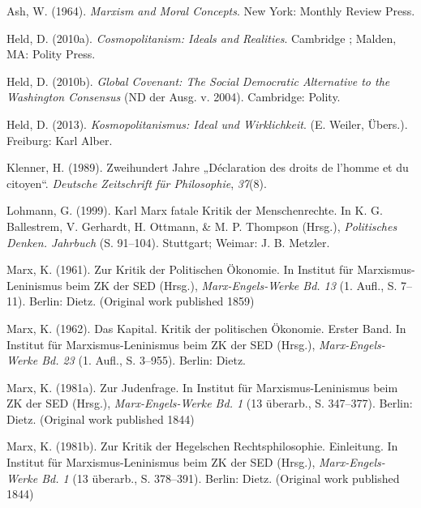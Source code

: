 \documentclass[ngerman,12pt, titlepage, smallheadings, nomath]{scrartcl}
\begin{document}
\vspace{-1em}

\indent
\vspace{-2em} \begingroup
\setlength{\parindent}{-0.2in} \setlength{\leftskip}{0.2in}
\setlength{\parskip}{8pt} \singlespacing

\hypertarget{refs}{}
\hypertarget{ref-ash1964}{}
Ash, W. (1964). \emph{Marxism and Moral Concepts}. New York: Monthly
Review Press.

\hypertarget{ref-held2010a}{}
Held, D. (2010a). \emph{Cosmopolitanism: Ideals and Realities}.
Cambridge ; Malden, MA: Polity Press.

\hypertarget{ref-held2010b}{}
Held, D. (2010b). \emph{Global Covenant: The Social Democratic
Alternative to the Washington Consensus} (ND der Ausg. v. 2004).
Cambridge: Polity.

\hypertarget{ref-held2013}{}
Held, D. (2013). \emph{Kosmopolitanismus: Ideal und Wirklichkeit}. (E.
Weiler, Übers.). Freiburg: Karl Alber.

\hypertarget{ref-klenner1989}{}
Klenner, H. (1989). Zweihundert Jahre „Déclaration des droits de l'homme
et du citoyen``. \emph{Deutsche Zeitschrift für Philosophie},
\emph{37}(8).

\hypertarget{ref-lohmann1999}{}
Lohmann, G. (1999). Karl Marx fatale Kritik der Menschenrechte. In K. G.
Ballestrem, V. Gerhardt, H. Ottmann, \& M. P. Thompson (Hrsg.),
\emph{Politisches Denken. Jahrbuch} (S. 91--104). Stuttgart; Weimar: J.
B. Metzler.

\hypertarget{ref-marx1961}{}
Marx, K. (1961). Zur Kritik der Politischen Ökonomie. In Institut für
Marxismus-Leninismus beim ZK der SED (Hrsg.), \emph{Marx-Engels-Werke
Bd. 13} (1. Aufl., S. 7--11). Berlin: Dietz. (Original work published
1859)

\hypertarget{ref-marx1962}{}
Marx, K. (1962). Das Kapital. Kritik der politischen Ökonomie. Erster
Band. In Institut für Marxismus-Leninismus beim ZK der SED (Hrsg.),
\emph{Marx-Engels-Werke Bd. 23} (1. Aufl., S. 3--955). Berlin: Dietz.

\hypertarget{ref-marx1981}{}
Marx, K. (1981a). Zur Judenfrage. In Institut für Marxismus-Leninismus
beim ZK der SED (Hrsg.), \emph{Marx-Engels-Werke Bd. 1} (13 überarb., S.
347--377). Berlin: Dietz. (Original work published 1844)

\hypertarget{ref-marx1981b}{}
Marx, K. (1981b). Zur Kritik der Hegelschen Rechtsphilosophie.
Einleitung. In Institut für Marxismus-Leninismus beim ZK der SED
(Hrsg.), \emph{Marx-Engels-Werke Bd. 1} (13 überarb., S. 378--391).
Berlin: Dietz. (Original work published 1844)
\end{document}
